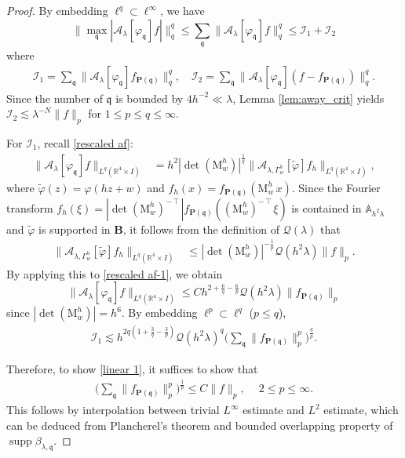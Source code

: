 \documentclass[10pt,a4paper]{amsart}
\newcommand{\fq}{\mathfrak q}
\DeclareMathOperator{\supp}{supp}
\begin{document}
\begin{proof}
By embedding $\ell^q \subset \ell^\infty$, we have
\[
\big\|\max_{\fq}|\mathcal A_\lambda [\varphi_{\fq}]f|\big\|_{q}^q
\le \sum_{\fq} \big\|\mathcal A_\lambda [\varphi_{\fq}]f\big\|_q^q
\le \mathcal I_1+\mathcal {I}_2
\]
where
\begin{align*}
\mathcal I_1=\sum_{\fq}\big\|\mathcal A_\lambda    [\varphi_{\fq}]f_{\mathbf P(\fq)}\big\|_q^q, \quad
\mathcal I_2=\sum_{\fq} \big\|\mathcal A_\lambda [\varphi_{\fq}](f-f_{\mathbf P(\fq)})\|_q^q.
\end{align*}
Since the number of $\fq$ is bounded by $4h^{-2} \ll \lambda $,   Lemma \ref{lem:away_crit} yields $\mathcal I_2 \lesssim \lambda^{-N}\|f\|_p$ for $1\le p \le q \le \infty$. 

 
For $\mathcal I_1$,  recall \eqref{rescaled af}:
\begin{align}
  \| \mathcal A_\lambda [\varphi_\fq] f \|_{L^q(\mathbb R^4\times I)}    
 & = h^2 |\det (\mathrm M_w^h)|^{\frac 1q}  \| \mathcal A_{\lambda,\Gamma_{w}^h} [\widetilde\varphi ] f_h \|_{L^q(\mathbb R^4\times I)} , \label{rescaled af-1}
\end{align}
where $\widetilde\varphi (z)  = \varphi( hz+w)$ and 
$f_h(x)=f_{\mathbf P(\fq)}(\mathrm M_w^h\,x)$.
Since the Fourier transform $\widehat{f_h}(\xi) = |\det ( \mathrm M_w^h)^{-\intercal}|  \widehat{f_{\mathbf P(\fq)}}((\mathrm M_w^h)^{-\intercal} \xi)$
is contained in $\mathbb A_{h^2\lambda}$ and $\widetilde\varphi$ is supported in $\mathbf B$,
it follows from the definition of $\mathscr Q(\lambda)$ that
\begin{align*}
\| \mathcal A_{\lambda , \Gamma_{w}^h} [\widetilde\varphi ] f_h \|_{L^q(\mathbb R^4\times I)}  
& \le  |\det (\mathrm M_w^h )|^{ -\frac1p} \mathscr Q  (h^2 \lambda) \|f\|_p .
\end{align*}
By applying this to \eqref{rescaled af-1}, we obtain
\begin{equation*} 
\| \mathcal A_\lambda[\varphi_{\fq} ] f\|_{L^q(\mathbb R^4\times I)} \le C h^{2 + \frac 6q - \frac 6p} \mathscr Q  (h^2 \lambda)  \| f_{\mathbf P(\fq)}\|_{p}
\end{equation*}
 since $|\det (\mathrm M_w^h )| = h^6$. 
By embedding $\ell^p \subset \ell^q$ ($p\le q$),  
\begin{align*}
\mathcal I_1 \lesssim h^{2q(1+\frac3q-\frac3p)}
\mathscr Q(h^2 \lambda)^q
\Big(\sum_{\fq}\|f_{\mathbf P(\fq)}\|_p^p\Big)^{\frac qp}.
\end{align*}


Therefore, to show \eqref{linear 1}, it suffices to show that
\begin{align}\label{little sum}
\big(\sum_{\fq} \big\| f_{\mathbf P(\fq)} \|_p^p \big)^{\frac1p} \le C \|f\|_p,~ \quad  2\le p \le \infty .
\end{align}
This follows by interpolation between trivial $L^\infty$ estimate and $L^2$ estimate, which can be  deduced from Plancherel's theorem and bounded overlapping property of $\supp \beta_{\lambda,\fq}$.


\end{proof}
\end{document}

